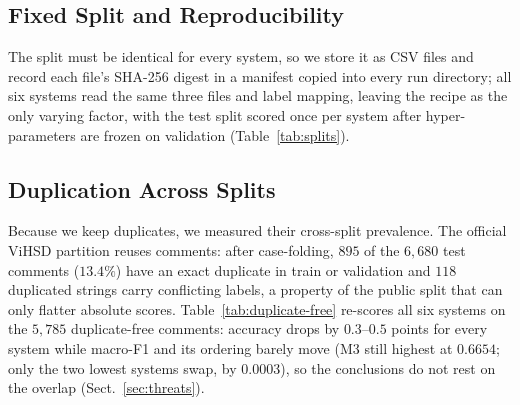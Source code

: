 \subsection{Fixed Split and Reproducibility}
The split must be identical for every system, so we store it as CSV files and record
each file's SHA-256 digest in a manifest copied into every run directory; all six
systems read the same three files and label mapping, leaving the recipe as the only
varying factor, with the test split scored once per system after hyper-parameters
are frozen on validation (Table~\ref{tab:splits}).



\subsection{Duplication Across Splits}
Because we keep duplicates, we measured their cross-split prevalence.  The official
ViHSD partition reuses comments: after case-folding, $895$ of the $6{,}680$ test
comments ($13.4\%$) have an exact duplicate in train or validation and $118$
duplicated strings carry conflicting labels, a property of the public split that
can only flatter absolute scores.  Table~\ref{tab:duplicate-free} re-scores all six
systems on the $5{,}785$ duplicate-free comments: accuracy drops by $0.3$--$0.5$
points for every system while macro-F1 and its ordering barely move (M3 still
highest at $0.6654$; only the two lowest systems swap, by $0.0003$), so the
conclusions do not rest on the overlap (Sect.~\ref{sec:threats}).


